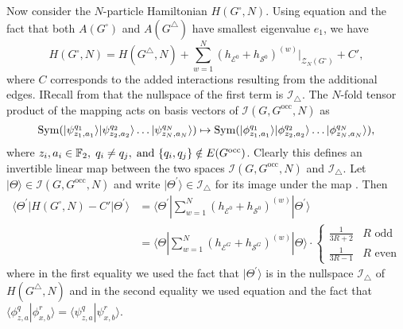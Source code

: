 \documentclass[../thesis-main/thesis-main]{subfiles}
\begin{document}
Now consider the $N$-particle Hamiltonian $H(G^{\square},N)$. Using equation  and the fact that both $A(G^{\square})$ and $A(G^{\triangle})$ have smallest eigenvalue $e_{1}$, we have
\begin{equation}
  H(G^{\square},N)=H(G^{\triangle},N)+\sum_{w=1}^{N}\left(h_{\mathcal{E}^{0}}+h_{\mathcal{S}^{0}}\right)^{(w)}\bigg|_{\mathcal{Z}_{N}(G^{\square})} + C',
\end{equation}
where $C$ corresponds to the added interactions resulting from the additional edges. IRecall from  that the nullspace of the first term is $\mathcal{I}_{\triangle}$. The $N$-fold tensor product of the mapping  acts on basis vectors of $\mathcal{I}(G,G^{\text{occ}},N)$ as 
\begin{equation}
  \operatorname{Sym}(|\psi_{z_{1},a_{1}}^{q_{1}}\rangle|\psi_{z_{2},a_{2}}^{q_{2}}\rangle\ldots|\psi_{z_{N},a_{N}}^{q_{N}}\rangle)
    \mapsto
  \operatorname{Sym}(|\phi_{z_{1},a_{1}}^{q_{1}}\rangle|\phi_{z_{2},a_{2}}^{q_{2}}\rangle\ldots|\phi_{z_{N},a_{N}}^{q_{N}}\rangle),
  \label{eq:N_particle_mapping}
\end{equation}
where $z_{i},a_{i}\in\mathbb{F}_2,\; q_{i}\neq q_{j},\;\text{and }\{q_{i},q_{j}\}\notin E(G^{\text{occ}})$.
Clearly this defines an invertible linear map between the two spaces
$\mathcal{I}(G,G^{\text{occ}},N)$ and $\mathcal{I}_{\triangle}$. Let $|\Theta\rangle\in\mathcal{I}(G,G^{\text{occ}},N)$
and write $|\Theta^{\prime}\rangle\in\mathcal{I}_{\triangle}$ for its image under the map . Then 
\begin{align}
  \langle\Theta^{\prime}|H(G^{\square},N)-C'|\Theta^{\prime}\rangle&=\langle\Theta^{\prime}|\sum_{w=1}^{N}\left(h_{\mathcal{E}^{0}}+h_{\mathcal{S}^{0}}\right)^{(w)}|\Theta^{\prime}\rangle\\
  &=\langle\Theta|\sum_{w=1}^{N}\left(h_{\mathcal{E}^{G}}+h_{\mathcal{S}^{G}}\right)^{(w)}|\Theta\rangle\cdot
  \begin{cases}
    \frac{1}{3R+2} & R\text{ odd}\\
    \frac{1}{3R-1} & R\text{ even}
  \end{cases}
\label{eq:Theta_Theta_prime_eqn}
\end{align}
where in the first equality we used the fact that $|\Theta^\prime\rangle$ is in the nullspace $\mathcal{I}_{\triangle}$ of $H(G^\triangle,N)$ and in the second equality we used equation  and the fact that $\langle\phi_{z,a}^{q}|\phi_{x,b}^{r}\rangle=\langle\psi_{z,a}^{q}|\psi_{x,b}^{r}\rangle$. 
\end{document}
